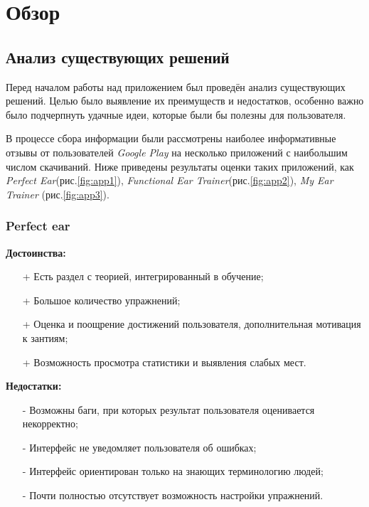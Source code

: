 \chapter{Обзор}
\section{Анализ существующих решений}
Перед началом работы над приложением был проведён анализ существующих решений. Целью было выявление их преимуществ и недостатков, особенно важно было подчерпнуть удачные идеи, которые были бы полезны для пользователя. \par
В процессе сбора информации были рассмотрены наиболее информативные отзывы от пользователей \textit{Google Play} на несколько приложений с наибольшим числом скачиваний. Ниже приведены результаты оценки таких приложений, как \textit{Perfect Ear}(рис.\ref{fig:app1}), \textit{Functional Ear Trainer}(рис.\ref{fig:app2}), \textit{My Ear Trainer} (рис.\ref{fig:app3}).
\subsection[Perfect ear]{Perfect ear\cite{Apps1}}
\begin{minipage}[t]{0.45\textwidth}
\textbf{Достоинства:}
\begin{itemize}
  \item[+] Есть раздел с теорией, интегрированный в обучение;
  \item[+] Большое количество упражнений;
  \item[+] Оценка и поощрение достижений пользователя, дополнительная мотивация к зантиям;
  \item[+] Возможность просмотра статистики и выявления слабых мест.
\end{itemize}
\end{minipage}
\hfill
\begin{minipage}[t]{0.45\textwidth}
\textbf{Недостатки:}
\begin{itemize}
  \item[-] Возможны баги, при которых результат пользователя оценивается некорректно;
  \item[-] Интерфейс не уведомляет пользователя об ошибках;
  \item[-] Интерфейс ориентирован только на знающих терминологию людей;
  \item[-] Почти полностью отсутствует возможность настройки упражнений.
\end{itemize}
\end{minipage} 

